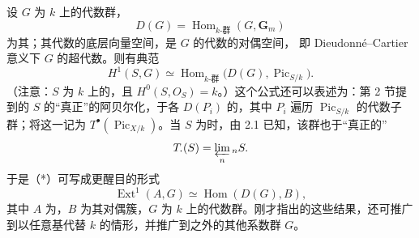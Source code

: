 设 $G$ 为 $k$ 上的代数群，
\[
D(G)=\operatorname{Hom}_{k\text{-群}}(G,\mathbf G_m)
\]
为其；其代数的底层向量空间，是 $G$ 的代数的对偶空间，
即 Dieudonné–Cartier 意义下 $G$ 的超代数。则有典范
\[
H^1(S,G)\simeq
\operatorname{Hom}_{k\text{-群}}\bigl(D(G),\operatorname{Pic}_{S/k}\bigr).
\tag{*}
\]
（注意：$S$ 为 $k$ 上的，且 $H^0(S,O_S)=k$。）这个公式还可以表述为：第 2 节提到的 $S$ 的“真正”的阿贝尔化，于各 $D(P_i)$ 的，其中 $P_i$ 遍历 $\operatorname{Pic}_{S/k}$ 的代数子群；将这一记为 $T^\bullet(\operatorname{Pic}_{X/k})$。当 $S$ 为时，由 2.1 已知，该群也于“真正的”
\[
T_{\boldsymbol\cdot}(S)=\varprojlim_n{}_nS.
\]
于是（*）可写成更醒目的形式
\[
\operatorname{Ext}^1(A,G)\simeq\operatorname{Hom}(D(G),B),
\]
其中 $A$ 为，$B$ 为其对偶簇，$G$ 为 $k$ 上的代数群。刚才指出的这些结果，还可推广到以任意基代替 $k$ 的情形，并推广到之外的其他系数群 $G$。

